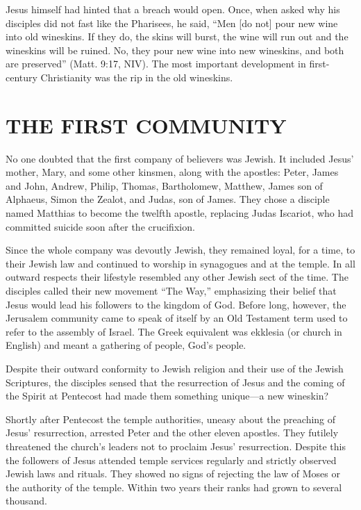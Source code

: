Jesus himself had hinted that a breach would open. Once, when asked why his disciples did not fast
like the Pharisees, he said, “Men [do not] pour new wine into old wineskins. If they do, the skins
will burst, the wine will run out and the wineskins will be ruined. No, they pour new wine into new
wineskins, and both are preserved” (Matt. 9:17, NIV). The most important development in
first-century Christianity was the rip in the old wineskins.

\section{THE FIRST COMMUNITY}

No one doubted that the first company of believers was Jewish. It included Jesus’ mother, Mary, and
some other kinsmen, along with the apostles: Peter, James and John, Andrew, Philip, Thomas,
Bartholomew, Matthew, James son of Alphaeus, Simon the Zealot, and Judas, son of James. They chose a
disciple named Matthias to become the twelfth apostle, replacing Judas Iscariot, who had committed
suicide soon after the crucifixion.

Since the whole company was devoutly Jewish, they remained loyal, for a time, to their Jewish law
and continued to worship in synagogues and at the temple. In all outward respects their lifestyle
resembled any other Jewish sect of the time. The disciples called their new movement “The Way,”
emphasizing their belief that Jesus would lead his followers to the kingdom of God. Before long,
however, the Jerusalem community came to speak of itself by an Old Testament term used to refer to
the assembly of Israel. The Greek equivalent was ekklesia (or church in English) and meant a
gathering of people, God’s people.

Despite their outward conformity to Jewish religion and their use of the Jewish Scriptures, the
disciples sensed that the resurrection of Jesus and the coming of the Spirit at Pentecost had made
them something unique—a new wineskin?

Shortly after Pentecost the temple authorities, uneasy about the preaching of Jesus’ resurrection,
arrested Peter and the other eleven apostles. They futilely threatened the church’s leaders not to
proclaim Jesus’ resurrection. Despite this the followers of Jesus attended temple services regularly
and strictly observed Jewish laws and rituals. They showed no signs of rejecting the law of Moses or
the authority of the temple. Within two years their ranks had grown to several thousand.

